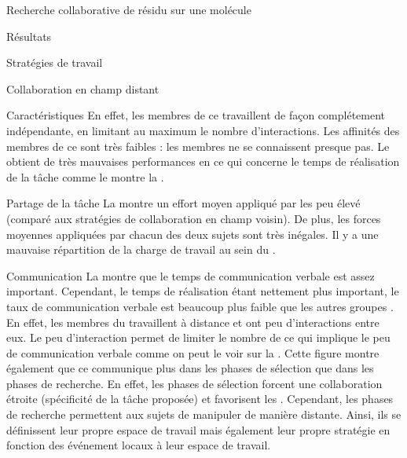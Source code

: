 \documentclass[myfrancais]{mythesis}
\begin{document}
\begin{mychapter}{Recherche collaborative de résidu sur une molécule}
\begin{mysection}{Résultats}
\begin{mysubsection}{Stratégies de travail}
\begin{mysubsubsection}{Collaboration en champ distant}
\begin{myparagraph}{Caractéristiques}
						En effet, les membres de ce  travaillent de façon complétement indépendante, en limitant au maximum le nombre d'interactions.
						Les affinités des membres de ce  sont très faibles  : les membres ne se connaissent presque pas.
						Le  obtient de très mauvaises performances en ce qui concerne le temps de réalisation de la tâche comme le montre la .
					\end{myparagraph}
					\begin{myparagraph}{Partage de la tâche}
						La  montre un effort moyen appliqué par les  peu élevé (comparé aux stratégies de collaboration en champ voisin).
						De plus, les forces moyennes appliquées par chacun des deux sujets sont très inégales.
						Il y a une mauvaise répartition de la charge de travail au sein du .
					\end{myparagraph}
					\begin{myparagraph}{Communication}
						La  montre que le temps de communication verbale est assez important.
						Cependant, le temps de réalisation étant nettement plus important, le taux de communication verbale est beaucoup plus faible que les autres groupes .
						En effet, les membres du  travaillent à distance et ont peu d'interactions entre eux.
						Le peu d'interaction permet de limiter le nombre de  ce qui implique le peu de communication verbale comme on peut le voir sur la .
						Cette figure montre également que ce  communique plus dans les phases de sélection que dans les phases de recherche.
						En effet, les phases de sélection forcent une collaboration étroite (spécificité de la tâche proposée) et favorisent les .
						Cependant, les phases de recherche permettent aux sujets de manipuler de manière distante.
						Ainsi, ils se définissent leur propre espace de travail mais également leur propre stratégie en fonction des événement locaux à leur espace de travail.

\end{myparagraph}
\end{mysubsubsection}
\end{mysubsection}
\end{mysection}
\end{mychapter}
\end{document}
